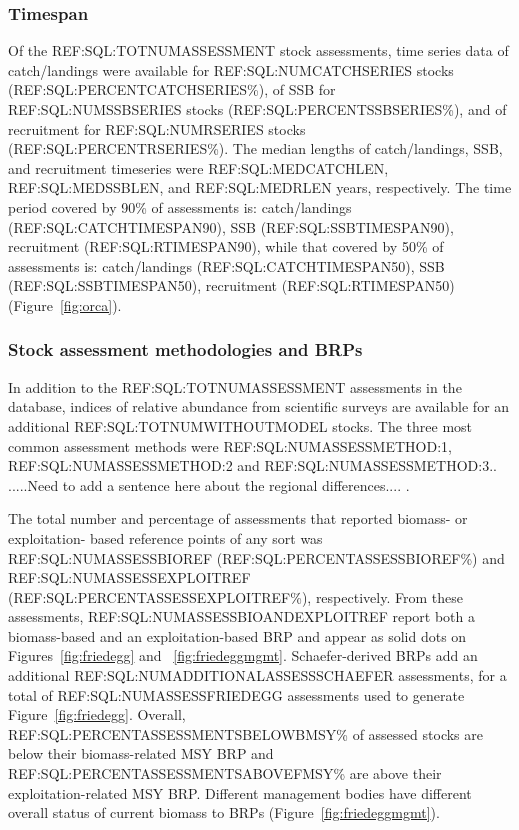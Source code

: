 
\subsubsection*{Timespan }

Of the REF:SQL:TOTNUMASSESSMENT stock assessments, time series data of
catch/landings were available for REF:SQL:NUMCATCHSERIES stocks (REF:SQL:PERCENTCATCHSERIES\%),
of SSB for REF:SQL:NUMSSBSERIES stocks (REF:SQL:PERCENTSSBSERIES\%), and of recruitment for
REF:SQL:NUMRSERIES stocks (REF:SQL:PERCENTRSERIES\%).  The median lengths of
catch/landings, SSB, and recruitment timeseries were
REF:SQL:MEDCATCHLEN, REF:SQL:MEDSSBLEN, and REF:SQL:MEDRLEN years,
respectively.  The time period covered by 90\%
of assessments is: catch/landings (REF:SQL:CATCHTIMESPAN90), SSB (REF:SQL:SSBTIMESPAN90), recruitment
(REF:SQL:RTIMESPAN90), while that covered by 50\% of assessments is: catch/landings
(REF:SQL:CATCHTIMESPAN50), SSB (REF:SQL:SSBTIMESPAN50), recruitment (REF:SQL:RTIMESPAN50) (Figure~\ref{fig:orca}).

\subsubsection*{Stock assessment methodologies and BRPs}
In addition to the REF:SQL:TOTNUMASSESSMENT assessments in the
database, indices of relative abundance from scientific surveys are
available for an additional REF:SQL:TOTNUMWITHOUTMODEL stocks. The
three most common assessment methods were REF:SQL:NUMASSESSMETHOD:1,
REF:SQL:NUMASSESSMETHOD:2 and REF:SQL:NUMASSESSMETHOD:3..  .....Need
to add a sentence here about the regional differences.... .


The total number and percentage of assessments that reported biomass-
or exploitation- based reference points of any sort was
REF:SQL:NUMASSESSBIOREF (REF:SQL:PERCENTASSESSBIOREF\%) and
REF:SQL:NUMASSESSEXPLOITREF (REF:SQL:PERCENTASSESSEXPLOITREF\%),
respectively. From these assessments,
REF:SQL:NUMASSESSBIOANDEXPLOITREF report both a biomass-based and an
exploitation-based BRP and appear as solid dots on
Figures~\ref{fig:friedegg} and ~\ref{fig:friedeggmgmt}. Schaefer-derived BRPs
add an additional REF:SQL:NUMADDITIONALASSESSSCHAEFER assessments, for
a total of REF:SQL:NUMASSESSFRIEDEGG assessments used to generate
Figure~\ref{fig:friedegg}. Overall,
REF:SQL:PERCENTASSESSMENTSBELOWBMSY\% of assessed stocks are below
their biomass-related MSY BRP and
REF:SQL:PERCENTASSESSMENTSABOVEFMSY\% are above their
exploitation-related MSY BRP. Different management bodies have
different overall status of current biomass to BRPs
(Figure~\ref{fig:friedeggmgmt}).
 
